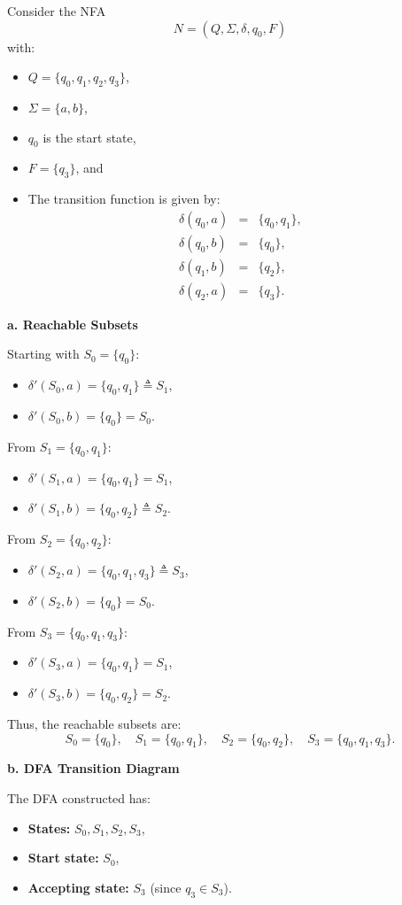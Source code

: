 \documentclass{article}
\theoremstyle{theorem}
\theoremstyle{definition}
\theoremstyle{remark}
\begin{document}
Consider the NFA
\[
N=(Q,\Sigma,\delta,q_0,F)
\]
with:
\begin{itemize}
    \item \(Q=\{q_0,q_1,q_2,q_3\}\),
    \item \(\Sigma=\{a,b\}\),
    \item \(q_0\) is the start state,
    \item \(F=\{q_3\}\), and
    \item The transition function is given by:
      \[
      \begin{array}{rcl}
      \delta(q_0,a) &=& \{q_0,q_1\},\\[1mm]
      \delta(q_0,b) &=& \{q_0\},\\[1mm]
      \delta(q_1,b) &=& \{q_2\},\\[1mm]
      \delta(q_2,a) &=& \{q_3\}.
      \end{array}
      \]
\end{itemize}

\textbf{a. Reachable Subsets}

Starting with \(S_0=\{q_0\}\):
\begin{itemize}
    \item \(\delta'(S_0,a)=\{q_0,q_1\}\triangleq S_1\),
    \item \(\delta'(S_0,b)=\{q_0\}=S_0\).
\end{itemize}
From \(S_1=\{q_0,q_1\}\):
\begin{itemize}
    \item \(\delta'(S_1,a)=\{q_0,q_1\}=S_1\),
    \item \(\delta'(S_1,b)=\{q_0,q_2\}\triangleq S_2\).
\end{itemize}
From \(S_2=\{q_0,q_2\}\):
\begin{itemize}
    \item \(\delta'(S_2,a)=\{q_0,q_1,q_3\}\triangleq S_3\),
    \item \(\delta'(S_2,b)=\{q_0\}=S_0\).
\end{itemize}
From \(S_3=\{q_0,q_1,q_3\}\):
\begin{itemize}
    \item \(\delta'(S_3,a)=\{q_0,q_1\}=S_1\),
    \item \(\delta'(S_3,b)=\{q_0,q_2\}=S_2\).
\end{itemize}
Thus, the reachable subsets are:
\[
S_0=\{q_0\},\quad S_1=\{q_0,q_1\},\quad S_2=\{q_0,q_2\},\quad S_3=\{q_0,q_1,q_3\}.
\]

\textbf{b. DFA Transition Diagram}

The DFA constructed has:
\begin{itemize}
    \item \textbf{States:} \(S_0, S_1, S_2, S_3\),
    \item \textbf{Start state:} \(S_0\),
    \item \textbf{Accepting state:} \(S_3\) (since \(q_3\in S_3\)).
\end{itemize}
\end{document}
